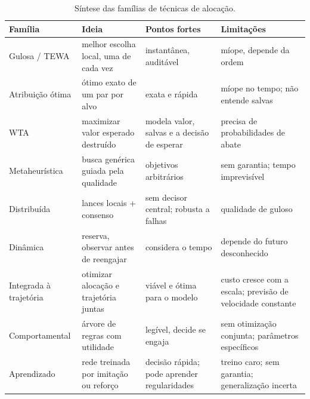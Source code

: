 \begin{table}[t]
\centering
\caption{Síntese das famílias de técnicas de alocação.}
\label{tab:sintese}
\scriptsize
\renewcommand{\arraystretch}{1.25}
\begin{tabularx}{\textwidth}{@{}>{\raggedright}p{2.1cm}>{\raggedright}X>{\raggedright}X>{\raggedright\arraybackslash}X@{}}
\toprule
Família & Ideia & Pontos fortes & Limitações \\
\midrule
Gulosa / TEWA & melhor escolha local, uma de cada vez & instantânea, auditável & míope, depende da ordem \\
Atribuição ótima & ótimo exato de um par por alvo & exata e rápida & míope no tempo; não entende salvas \\
WTA & maximizar valor esperado destruído & modela valor, salvas e a decisão de esperar & precisa de probabilidades de abate \\
Metaheurística & busca genérica guiada pela qualidade & objetivos arbitrários & sem garantia; tempo imprevisível \\
Distribuída & lances locais + consenso & sem decisor central; robusta a falhas & qualidade de guloso \\
Dinâmica & reserva, observar antes de reengajar & considera o tempo & depende do futuro desconhecido \\
Integrada à trajetória & otimizar alocação e trajetória juntas & viável e ótima para o modelo & custo cresce com a escala; previsão de velocidade constante \\
Comportamental & árvore de regras com utilidade & legível, decide se engaja & sem otimização conjunta; parâmetros específicos \\
Aprendizado & rede treinada por imitação ou reforço & decisão rápida; pode aprender regularidades & treino caro; sem garantia; generalização incerta \\
\bottomrule
\end{tabularx}
\end{table}

